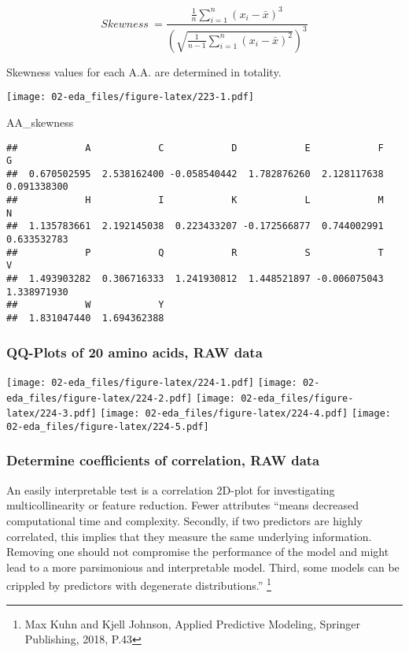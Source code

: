 \documentclass[]{article}
\newenvironment{Shaded}{\begin{snugshade}}{\end{snugshade}}
\newcommand{\NormalTok}[1]{#1}
\begin{document}
\begin{equation} 
Skewness ~= \frac { \frac{1}{n} \sum^n_{i=1} (x_i - \bar x)^3 } { \left( \sqrt{ \frac{1}{n-1} \sum^n_{i=1} (x_i - \bar x)^2 } \right) ^ {3}}
\end{equation}

Skewness values for each A.A. are determined in totality.

\texttt{[image: 02-eda\_files/figure-latex/223-1.pdf]}

\begin{Shaded}
\begin{Highlighting}[]
\NormalTok{AA_skewness}
\end{Highlighting}
\end{Shaded}

\begin{verbatim}
##            A            C            D            E            F            G 
##  0.670502595  2.538162400 -0.058540442  1.782876260  2.128117638  0.091338300 
##            H            I            K            L            M            N 
##  1.135783661  2.192145038  0.223433207 -0.172566877  0.744002991  0.633532783 
##            P            Q            R            S            T            V 
##  1.493903282  0.306716333  1.241930812  1.448521897 -0.006075043  1.338971930 
##            W            Y 
##  1.831047440  1.694362388
\end{verbatim}

\hypertarget{qq-plots-of-20-amino-acids-raw-data}{%
\subsubsection{QQ-Plots of 20 amino acids, RAW
data}\label{qq-plots-of-20-amino-acids-raw-data}}

\texttt{[image: 02-eda\_files/figure-latex/224-1.pdf]}
\texttt{[image: 02-eda\_files/figure-latex/224-2.pdf]}
\texttt{[image: 02-eda\_files/figure-latex/224-3.pdf]}
\texttt{[image: 02-eda\_files/figure-latex/224-4.pdf]}
\texttt{[image: 02-eda\_files/figure-latex/224-5.pdf]}

\hypertarget{determine-coefficients-of-correlation-raw-data}{%
\subsubsection{Determine coefficients of correlation, RAW
data}\label{determine-coefficients-of-correlation-raw-data}}

An easily interpretable test is a correlation 2D-plot for investigating
multicollinearity or feature reduction. Fewer attributes ``means
decreased computational time and complexity. Secondly, if two predictors
are highly correlated, this implies that they measure the same
underlying information. Removing one should not compromise the
performance of the model and might lead to a more parsimonious and
interpretable model. Third, some models can be crippled by predictors
with degenerate distributions.'' \footnote{Max Kuhn and Kjell Johnson,
  Applied Predictive Modeling, Springer Publishing, 2018, P.43}
\end{document}
